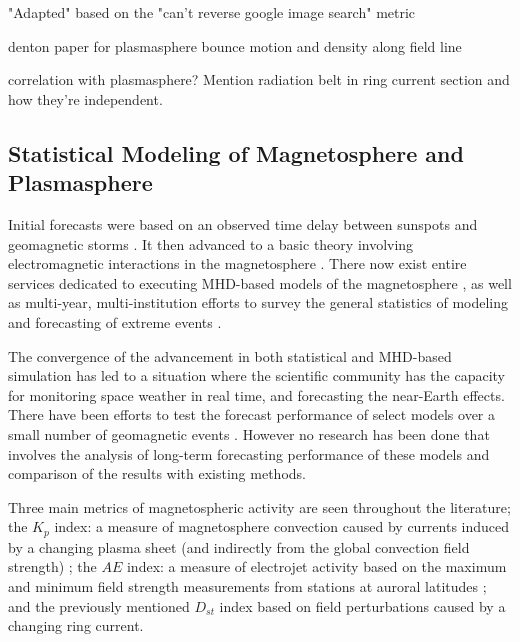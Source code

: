 \vnote "Adapted" based on the "can't reverse google image search" metric

\vnote denton paper for plasmasphere bounce motion and density along field line

\vnote correlation with plasmasphere? Mention radiation belt in ring current section and how they're independent. 

\subsection{Statistical Modeling of Magnetosphere and Plasmasphere}

Initial forecasts were based on an observed time delay between sunspots and geomagnetic storms \cite{SunspotStorms}. It then advanced to a basic theory involving electromagnetic interactions in the magnetosphere \cite{Chapman}. There now exist entire services dedicated to executing MHD-based models of the magnetosphere \cite{CCMC}, as well as multi-year, multi-institution efforts to survey the general statistics of modeling and forecasting of extreme events \cite{ExtremeEvents}.

The convergence of the advancement in both statistical and MHD-based simulation has led to a situation where the scientific community has the capacity for monitoring space weather in real time, and forecasting the near-Earth effects.  There have been efforts to test the forecast performance of select models over a small number of geomagnetic events \cite{ANNforecast,StormModel,StatCompStorms,Yermolaev}. However no research has been done that involves the analysis of long-term forecasting performance of these models and comparison of the results with existing methods.

Three main metrics of magnetospheric activity are seen throughout the literature; the $K_p$ index: a measure of magnetosphere convection caused by currents induced by a changing plasma sheet (and indirectly from the global convection field strength) \cite{Thomsen2004WhyKpSoGood}; the $AE$ index: a measure of electrojet activity based on the maximum and minimum field strength measurements from stations at auroral latitudes \cite{DavisSugiura1966AE}; and the previously mentioned $D_{st}$ index based on field perturbations caused by a changing ring current.

